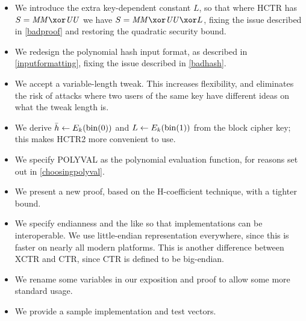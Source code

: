 \documentclass[hctr2.tex]{subfiles}
\begin{document}
\begin{itemize}
    \item We introduce the extra
    key-dependent constant \(L\),
    so that where HCTR has \(S = \MM \xor \UU\)
    we have \(S = \MM \xor \UU \xor L\),
    fixing the issue described in \autoref{badproof}
    and restoring the quadratic security bound.
    \item We redesign the polynomial hash input format, as described in
    \autoref{inputformatting}, fixing the issue described in \autoref{badhash}.
    \item We accept a variable-length tweak.
    This increases flexibility,
    and eliminates the risk of attacks where
    two users of the same key have different ideas
    on what the tweak length is.
    \item We derive \(\bar{h} \gets E_k(\operatorname{bin}(0))\)
    and \(L \gets E_k(\operatorname{bin}(1))\) from the block cipher key;
    this makes HCTR2 more convenient to use.
    \item We specify POLYVAL\cite{aes_gcm_siv,aes_gcm_siv_rfc}
    as the polynomial evaluation function,
    for reasons set out in \autoref{choosingpolyval}.
    \item We present a new proof, based on the H-coefficient technique,
    with a tighter bound.
    \item We specify endianness and the like so that implementations can be interoperable. We use little-endian representation everywhere,
    since this is faster on nearly all modern platforms.
    This is another difference between XCTR and CTR, since
    CTR is defined to be big-endian.
    \item We rename some variables in our exposition and proof to allow some more standard usage.
    \item We provide a sample implementation and test vectors.
\end{itemize}
\end{document}
